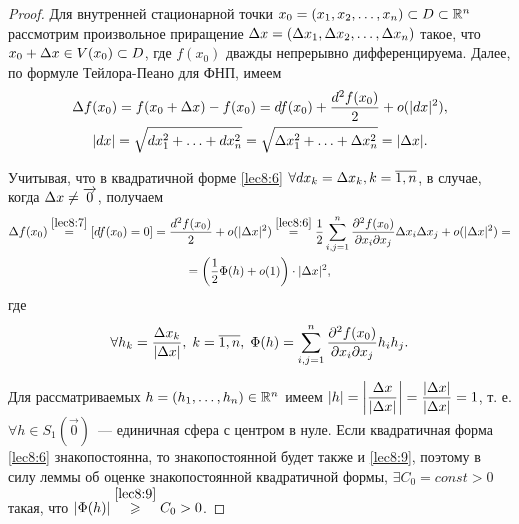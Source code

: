 \documentclass[../../main.tex]{subfiles}
\begin{document}
    \begin{proof}
        Для внутренней стационарной точки $x_0 = (x_1, x_2, \ldots, x_n)
        \subset D \subset \R^n$ рассмотрим произвольное приращение $\D x =
        (\D x_1, \D x_2, \ldots, \D x_n)$ такое, что $x_0 + \D x \in V(x_0)
        \subset D$, где $f(x_0)$ дважды непрерывно дифференцируема. Далее, по
        формуле Тейлора-Пеано для ФНП, имеем
        \begin{equation}
            \begin{gathered}
                \D f(x_0) = f(x_0 + \D x) - f(x_0) = df(x_0) +
                \frac{d^2f(x_0)}2 + o(|dx|^2), \\|dx| = \sqrt{dx_1^2 + \ldots
                + dx_n^2} = \sqrt{\D x_1^2 + \ldots + \D x_n^2} = |\D x|.
            \end{gathered}
            \label{lec8:7}
        \end{equation}

        Учитывая, что в квадратичной форме \eqref{lec8:6} $\forall dx_k = \D
        x_k, k = \overline{1, n}$, в случае, когда $\D x \ne
        \overrightarrow{0}$, получаем
        \begin{equation}
            \begin{gathered}
                \D f(x_0) \stackrel{\eqref{lec8:7}}{=} [df(x_0) = 0] =
                \frac{d^2f(x_0)}2 + o(|\D x|^2) \stackrel{\eqref{lec8:6}}{=}
                \frac12 \sum_{i, j = 1}^n\pderiv{^2f(x_0)}{x_i\partial x_j}\D
                x_i \D x_j+ o(|\D x|^2) = \\ =\left(\frac12 \Phi(h) +
                o(1)\right) \cdot |\D x|^2,
            \end{gathered}
            \label{lec8:8}
        \end{equation}
        где
        \begin{equation}
            \forall h_k = \frac{\D x_k}{|\D x|}, \; k = \overline{1,n}, \;
            \Phi(h) = \sum_{i, j = 1}^n\pderiv{^2f(x_0)}{x_i\partial x_j}h_ih_j.
        \label{lec8:9}
        \end{equation}

        Для рассматриваемых $h = (h_1, \ldots, h_n) \in \R^n$ имеем
        $|h| = \left|\dfrac{\D x}{|\D x|}\right| = \dfrac{|\D x|}{|\D x|} = 1$,
        т. е. $\forall h \in S_1(\overrightarrow{0})$~--- единичная сфера с
        центром в нуле. Если квадратичная форма \eqref{lec8:6} знакопостоянна,
        то знакопостоянной будет также и \eqref{lec8:9}, поэтому в силу леммы
        об оценке знакопостоянной квадратичной формы, $\exists C_0 = const >
        0$ такая, что $|\Phi(h)| \stackrel{\eqref{lec8:9}}{\geq} C_0 > 0$.


\end{proof}
\end{document}
